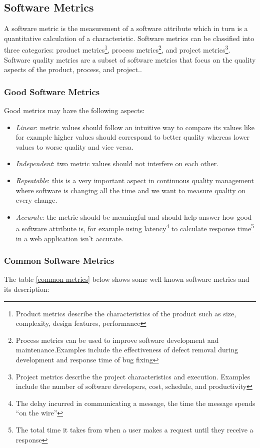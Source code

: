 \subsection{Software Metrics}
A software metric is the measurement of a software attribute which in turn is a quantitative calculation of a characteristic. Software metrics can be classified into three categories: product metrics\footnote{Product metrics describe the characteristics of the product such as size, complexity, design features, performance}, process metrics\footnote{Process metrics can be used to improve software development and maintenance.Examples include the effectiveness of defect removal during development and response time of bug fixing}, and project metrics\footnote{Project metrics describe the project characteristics and execution. Examples include the number of
software developers, cost, schedule, and productivity}. Software quality metrics are a subset of software metrics that focus on the quality aspects of the product, process, and project.\citep{Kan 2002}.


\subsubsection{Good Software Metrics}
Good metrics may have the following aspects:

\begin{itemize}
  \item \emph{Linear}: metric values should follow an intuitive way to compare its values like for example higher values should correspond to better quality whereas lower values to worse quality and vice versa. 
  \item \emph{Independent}: two metric values should not interfere on each other.
  \item \emph{Repeatable}: this is a very important aspect in continuous quality management where software is changing all the time and we want to measure quality on every change.
  \item \emph{Accurate}: the metric should be meaningful and should help answer how good a software attribute is, for example using latency\footnote{The delay incurred in communicating a message, the time the message spends “on the wire”} to calculate response time\footnote{The total time it takes from when a user makes a request until they receive a response} in a web application isn't accurate.       
\end{itemize}


\subsubsection{Common Software Metrics}
The table \ref{common metrics} below shows some well known software metrics and its description:

